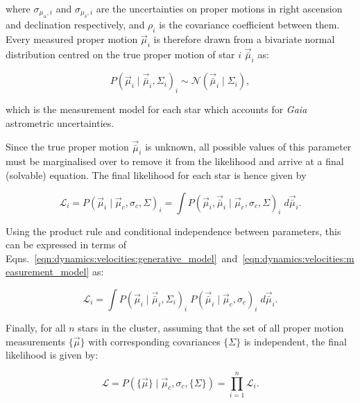 \noindent
where $\sigma_{\mu_\alpha, i}$ and $\sigma_{\mu_\delta, i}$ are the uncertainties on proper motions in right ascension and declination respectively, and $\rho_i$ is the covariance coefficient between them. Every measured proper motion $\vec{\mu}_i$ is therefore drawn from a bivariate normal distribution centred on the true proper motion of star $i$ $\vec{\bar{\mu}}_i$ as:

\begin{equation}\label{eqn:dynamics:velocities:measurement_model}
    P(\vec{\mu}_i \mid
    \vec{\bar{\mu}}_i, \Sigma_i)_i \sim \mathcal{N}(\vec{\bar{\mu}}_i \mid \Sigma_i),
\end{equation}

\noindent
which is the measurement model for each star which accounts for \emph{Gaia} astrometric uncertainties.

Since the true proper motion $\vec{\bar{\mu}}_i$ is unknown, all possible values of this parameter must be marginalised over to remove it from the likelihood and arrive at a final (solvable) equation. The final likelihood for each star is hence given by

\begin{equation}
    \mathcal{L}_i = P(\vec{\mu}_i \mid \vec{\mu}_c, \sigma_c, \Sigma)_i = 
    \int P(\vec{\mu}_i, \vec{\bar{\mu}}_i \mid \vec{\mu}_c, \sigma_c, \Sigma)_i \; d \vec{\bar{\mu}}_i.
\end{equation}

\noindent
Using the product rule and conditional independence between parameters, this can be expressed in terms of Eqns.~\ref{eqn:dynamics:velocities:generative_model}~and~\ref{eqn:dynamics:velocities:measurement_model} as:

\begin{equation}
    \mathcal{L}_i%
    = \int P(\vec{\mu}_i \mid \vec{\bar{\mu}}_i, \Sigma_i)_i \;
    P(\vec{\bar{\mu}}_i \mid \vec{\mu}_c, \sigma_c)_i \;
    d \vec{\bar{\mu}}_i.
\end{equation}

Finally, for all $n$ stars in the cluster, assuming that the set of all proper motion measurements $\{\vec{\mu}\}$ with corresponding covariances $\{\Sigma\}$ is independent, the final likelihood is given by:

\begin{equation}\label{eqn:dynamics:velocities:final_likelihood}
    \mathcal{L} 
    = P(\{\vec{\mu}\}\mid\vec{\mu}_c,\sigma_c,\{\Sigma\}) 
    = \prod_{i=1}^{n} \mathcal{L}_i.
\end{equation}


